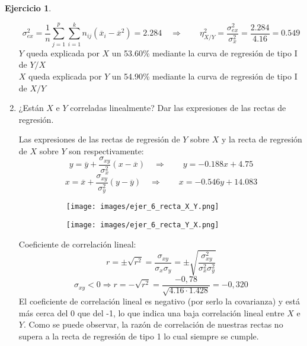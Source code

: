 \documentclass[a4paper, 12pt]{article}
\theoremstyle{definition}
\newtheorem{ej}{Ejercicio}
\begin{document}
\begin{ej}
\begin{enumerate}[label=\alph*)]
\[
	\sigma_{ex}^2=\frac{1}{n}\sum_{j=1}^p\sum_{i=1}^k n_{ij}(\overline{x}_i - \overline{x}^2) = 2.284\quad \Longrightarrow \qquad
	\eta_{X/Y}^{2} = \frac{\sigma_{ex}^2}{\sigma_x^2} = \frac{2.284}{4.16} = 0.549
\]
$Y$ queda explicada por $X$ un 53.60\% mediante la curva de regresión de tipo I de $Y/X$ \\
$X$ queda explicada por $Y$ un 54.90\% mediante la curva de regresión de tipo I de $X/Y$ \\

	\item ¿Están \(X\) e \(Y\) correladas linealmente? Dar las expresiones de las rectas de regresión.
	
Las expresiones de las rectas de regresión de \(Y\) sobre \(X\) y la recta de regresión de \(X\) sobre \(Y\) son respectivamente:
\[
	y = \overline{y} + \frac{\sigma_{xy}}{\sigma_x^2} (x - \overline{x})\quad\Longrightarrow\qquad y = -0.188x + 4.75
\]
\[
	 x  = \overline{x} + \frac{\sigma_{xy}}{\sigma_y^2} (y - \overline{y})\quad\Longrightarrow\qquad x = -0.546y + 14.083
\]
    \begin{figure}[h!]
        \centering
        \begin{subfigure}[b]{0.45\linewidth}
        \texttt{[image: images/ejer\_6\_recta\_X\_Y.png]}
        \end{subfigure}
        \begin{subfigure}[b]{0.45\linewidth}
        \texttt{[image: images/ejer\_6\_recta\_Y\_X.png]}
        \end{subfigure}
    \end{figure}
    
    
Coeficiente de correlación lineal:
\[
    r = \pm\sqrt{r^2} = \frac{\sigma_{xy}}{\sigma_{x}\sigma_{y}} = \pm\sqrt{\frac{\sigma_{xy}^2}{\sigma_{x}^2\sigma_{y}^2}}
\]
\[
\sigma_{xy} < 0 \Longrightarrow r = -\sqrt{r^2} = \frac{-0,78}{\sqrt{4.16\cdot 1.428}} = -0,320
\]
El coeficiente de correlación lineal es negativo (por serlo la covarianza) y está más cerca del 0 que del -1, lo que indica una baja correlación lineal entre $X$ e $Y$.
Como se puede observar, la razón de correlación de nuestras rectas no supera a la recta de regresión de tipo 1 lo cual siempre se cumple.
\end{enumerate}

\end{ej}
\end{document}
